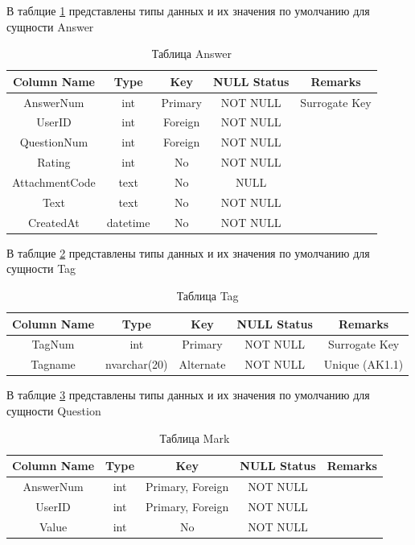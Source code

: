 \documentclass[a4paper, 14pt]{extarticle}
\begin{document}
В таблцие \ref{tab:answer_tab} представлены типы данных и их значения по умолчанию для сущности Answer

\begin{table}[H]
\centering
\caption{Таблица Answer}
\label{tab:answer_tab}
\setlength\extrarowheight{2pt}
\begin{tabular}{|c|c|c|c|c|}
\hline
\textbf{Column Name} & \textbf{Type} & \textbf{Key} & \textbf{NULL Status} & \textbf{Remarks} \\
\hline
AnswerNum & int & Primary & NOT NULL & Surrogate Key \\
\hline
UserID & int & Foreign & NOT NULL & \\
\hline
QuestionNum & int & Foreign & NOT NULL & \\
\hline
Rating & int & No & NOT NULL & \\
\hline
AttachmentCode & text & No & NULL & \\
\hline
Text & text & No & NOT NULL & \\
\hline
CreatedAt & datetime & No & NOT NULL & \\
\hline
\end{tabular}
\end{table}


В таблцие \ref{tab:tag_tab} представлены типы данных и их значения по умолчанию для сущности Tag

\begin{table}[H]
\centering
\caption{Таблица Tag}
\label{tab:tag_tab}
\setlength\extrarowheight{2pt}
\begin{tabular}{|c|c|c|c|c|}
\hline
\textbf{Column Name} & \textbf{Type} & \textbf{Key} & \textbf{NULL Status} & \textbf{Remarks} \\
\hline
TagNum & int & Primary & NOT NULL & Surrogate Key \\
\hline
Tagname & nvarchar(20) & Alternate & NOT NULL & Unique (AK1.1) \\
\hline
\end{tabular}
\end{table}


В таблцие \ref{tab:mark_tab} представлены типы данных и их значения по умолчанию для сущности Question

\begin{table}[H]
\centering
\caption{Таблица Mark}
\label{tab:mark_tab}
\setlength\extrarowheight{2pt}
\begin{tabular}{|c|c|c|c|c|}
\hline
\textbf{Column Name} & \textbf{Type} & \textbf{Key} & \textbf{NULL Status} & \textbf{Remarks} \\
\hline
AnswerNum & int & Primary, Foreign & NOT NULL & \\
\hline
UserID & int & Primary, Foreign & NOT NULL & \\
\hline
Value & int & No & NOT NULL & \\
\hline
\end{tabular}
\end{table}
\end{document}
